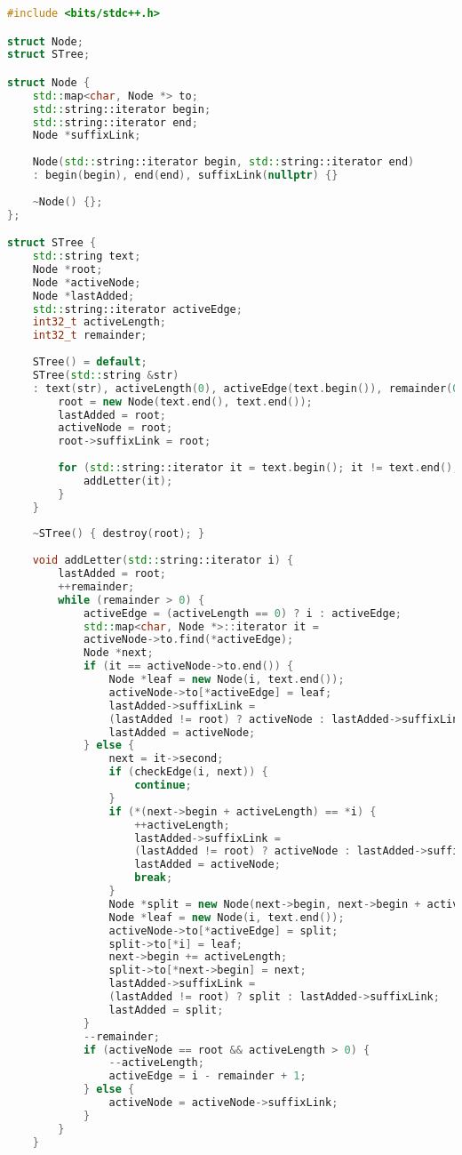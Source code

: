 \begin{lstlisting}[language=C++]
#include <bits/stdc++.h>

struct Node;
struct STree;

struct Node {
	std::map<char, Node *> to;
	std::string::iterator begin;
	std::string::iterator end;
	Node *suffixLink;
	
	Node(std::string::iterator begin, std::string::iterator end)
	: begin(begin), end(end), suffixLink(nullptr) {}
	
	~Node() {};
};

struct STree {
	std::string text;
	Node *root;
	Node *activeNode;
	Node *lastAdded;
	std::string::iterator activeEdge;
	int32_t activeLength;
	int32_t remainder;
	
	STree() = default;
	STree(std::string &str)
	: text(str), activeLength(0), activeEdge(text.begin()), remainder(0) {
		root = new Node(text.end(), text.end());
		lastAdded = root;
		activeNode = root;
		root->suffixLink = root;
		
		for (std::string::iterator it = text.begin(); it != text.end(); ++it) {
			addLetter(it);
		}
	}
	
	~STree() { destroy(root); }
	
	void addLetter(std::string::iterator i) {
		lastAdded = root;
		++remainder;
		while (remainder > 0) {
			activeEdge = (activeLength == 0) ? i : activeEdge;
			std::map<char, Node *>::iterator it =
			activeNode->to.find(*activeEdge);
			Node *next;
			if (it == activeNode->to.end()) {
				Node *leaf = new Node(i, text.end());
				activeNode->to[*activeEdge] = leaf;
				lastAdded->suffixLink =
				(lastAdded != root) ? activeNode : lastAdded->suffixLink;
				lastAdded = activeNode;
			} else {
				next = it->second;
				if (checkEdge(i, next)) {
					continue;
				}
				if (*(next->begin + activeLength) == *i) {
					++activeLength;
					lastAdded->suffixLink =
					(lastAdded != root) ? activeNode : lastAdded->suffixLink;
					lastAdded = activeNode;
					break;
				}
				Node *split = new Node(next->begin, next->begin + activeLength);
				Node *leaf = new Node(i, text.end());
				activeNode->to[*activeEdge] = split;
				split->to[*i] = leaf;
				next->begin += activeLength;
				split->to[*next->begin] = next;
				lastAdded->suffixLink =
				(lastAdded != root) ? split : lastAdded->suffixLink;
				lastAdded = split;
			}
			--remainder;
			if (activeNode == root && activeLength > 0) {
				--activeLength;
				activeEdge = i - remainder + 1;
			} else {
				activeNode = activeNode->suffixLink;
			}
		}
	}
	

\end{lstlisting}
